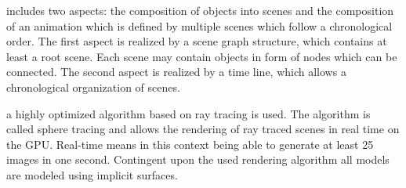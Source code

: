  includes two aspects: the composition of objects into
scenes and the composition of an animation which is defined by multiple scenes
which follow a chronological order. The first aspect is realized by a scene
graph structure, which contains at least a root scene. Each scene may contain
objects in form of nodes which can be connected. The second aspect is realized
by a time line, which allows a chronological organization of scenes.

 a highly optimized algorithm based on ray tracing is
used. The algorithm is called sphere tracing and allows the rendering of ray
traced scenes in real time on the GPU. Real-time means in this context being
able to generate at least 25 images in one second. Contingent upon the used
rendering algorithm all models are modeled using implicit surfaces.